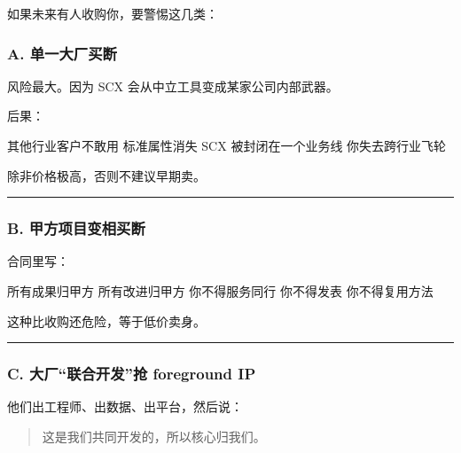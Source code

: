 \documentclass[
  12pt,
]{ctexart}
\newenvironment{Shaded}{}{}
\newcommand{\NormalTok}[1]{#1}
\begin{document}
如果未来有人收购你，要警惕这几类：

\subsubsection{A.
单一大厂买断}\label{a.-ux5355ux4e00ux5927ux5382ux4e70ux65ad}

风险最大。因为 SCX 会从中立工具变成某家公司内部武器。

后果：

\begin{Shaded}
\begin{Highlighting}[]
\NormalTok{其他行业客户不敢用}
\NormalTok{标准属性消失}
\NormalTok{SCX 被封闭在一个业务线}
\NormalTok{你失去跨行业飞轮}
\end{Highlighting}
\end{Shaded}

除非价格极高，否则不建议早期卖。

\begin{center}\rule{0.5\linewidth}{0.5pt}\end{center}

\subsubsection{B.
甲方项目变相买断}\label{b.-ux7532ux65b9ux9879ux76eeux53d8ux76f8ux4e70ux65ad}

合同里写：

\begin{Shaded}
\begin{Highlighting}[]
\NormalTok{所有成果归甲方}
\NormalTok{所有改进归甲方}
\NormalTok{你不得服务同行}
\NormalTok{你不得发表}
\NormalTok{你不得复用方法}
\end{Highlighting}
\end{Shaded}

这种比收购还危险，等于低价卖身。

\begin{center}\rule{0.5\linewidth}{0.5pt}\end{center}

\subsubsection{C. 大厂``联合开发''抢 foreground
IP}\label{c.-ux5927ux5382ux8054ux5408ux5f00ux53d1ux62a2-foreground-ip}

他们出工程师、出数据、出平台，然后说：

\begin{quote}
这是我们共同开发的，所以核心归我们。
\end{quote}
\end{document}
